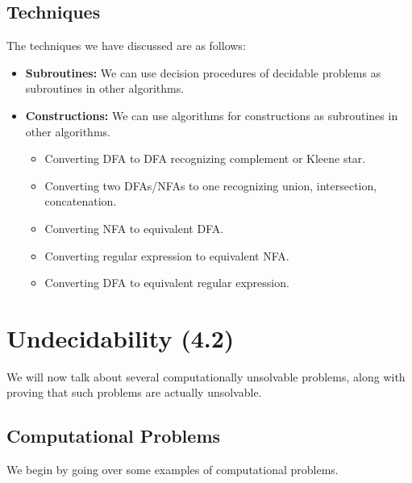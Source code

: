 \documentclass[letterpaper]{article}
\begin{document}
\subsection{Techniques}
The techniques we have discussed are as follows: 
\begin{itemize}
    \item \textbf{Subroutines:} We can use decision procedures of decidable problems as subroutines in other algorithms. 
    \item \textbf{Constructions:} We can use algorithms for constructions as subroutines in other algorithms.
    \begin{itemize}
        \item Converting DFA to DFA recognizing complement or Kleene star. 
        \item Converting two DFAs/NFAs to one recognizing union, intersection, concatenation. 
        \item Converting NFA to equivalent DFA. 
        \item Converting regular expression to equivalent NFA. 
        \item Converting DFA to equivalent regular expression.
    \end{itemize}
\end{itemize}









































\newpage 
\section{Undecidability (4.2)} 
We will now talk about several computationally unsolvable problems, along with proving that such problems are actually unsolvable.

\subsection{Computational Problems}
We begin by going over some examples of computational problems. 
\end{document}
